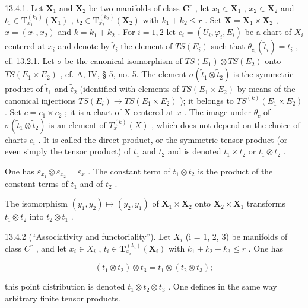 13.4.1. Let \(\mathbf{X}_1\) and \(\mathbf{X}_2\) be two manifolds of class \(\mathbf{C}^r\) , let \(x_1 \in \mathbf{X}_1\) , \(x_2 \in \mathbf{X}_2\) and \(t_1 \in \mathrm{T}_{x_1}^{(k_1)}(\mathbf{X}_1)\) , \(t_2 \in \mathrm{T}_{x_2}^{(k_2)}(\mathbf{X}_2)\) with \(k_1 + k_2 \leqslant r\) . Set \(\mathbf{X} = \mathbf{X}_1 \times \mathbf{X}_2\) , \(x = (x_1, x_2)\) and \(k = k_{1} + k_{2}\) . For \(i = 1, 2\) let \(c_{i} = (U_{i}, \varphi_{i}, E_{i})\) be a chart of \(X_{i}\) centered at \(x_{i}\) and denote by \(\tilde{t}_{i}\) the element of \(TS(E_{i})\) such that \(\theta_{c_i}(\tilde{t}_{i}) = t_{i}\) , cf. 13.2.1. Let \(\sigma\) be the canonical isomorphism of \(TS(E_{1}) \otimes TS(E_{2})\) onto \(TS(E_{1} \times E_{2})\) , cf. A, IV, § 5, no. 5. The element \(\sigma(\tilde{t}_{1} \otimes \tilde{t}_{2})\) is the symmetric product of \(\tilde{t}_{1}\) and \(\tilde{t}_{2}\) (identified with elements of \(TS(E_{1} \times E_{2})\) by means of the canonical injections \(TS(E_{i}) \to TS(E_{1} \times E_{2})\) ); it belongs to \(TS^{(k)}(E_{1} \times E_{2})\) . Set \(c = c_{1} \times c_{2}\) ; it is a chart of X centered at \(x\) . The image under \(\theta_{c}\) of \(\sigma(\tilde{t}_{1} \otimes \tilde{t}_{2})\) is an element of \(T_{x}^{(k)}(X)\) , which does not depend on the choice of charts \(c_{i}\) . It is called the direct product, or the symmetric tensor product (or even simply the tensor product) of \(t_{1}\) and \(t_{2}\) and is denoted \(t_{1} \times t_{2}\) or \(t_{1} \otimes t_{2}\) .

One has \(\varepsilon_{x_1} \otimes \varepsilon_{x_2} = \varepsilon_x\) . The constant term of \(t_1 \otimes t_2\) is the product of the constant terms of \(t_1\) and of \(t_2\) .

The isomorphism \((y_{1}, y_{2}) \mapsto (y_{2}, y_{1})\) of \(\mathbf{X}_{1} \times \mathbf{X}_{2}\) onto \(\mathbf{X}_{2} \times \mathbf{X}_{1}\) transforms \(t_{1} \otimes t_{2}\) into \(t_{2} \otimes t_{1}\) .

13.4.2 (“Associativity and functoriality”). Let \(X_{i}\) (i = 1, 2, 3) be manifolds of class \(C^{r}\) , and let \(x_{i} \in X_{i}\) , \(t_{i} \in \mathbf{T}_{x_{i}}^{(k_{i})}(\mathbf{X}_{i})\) with \(k_{1} + k_{2} + k_{3} \leqslant r\) . One has

\[
\left(t _ {1} \otimes t _ {2}\right) \otimes t _ {3} = t _ {1} \otimes \left(t _ {2} \otimes t _ {3}\right);
\]

this point distribution is denoted \(t_{1} \otimes t_{2} \otimes t_{3}\) . One defines in the same way arbitrary finite tensor products.

